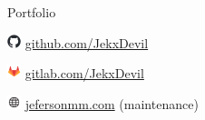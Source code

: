 \documentclass{cv} %
\def\iconsize{0.4cm}
\begin{document}
\begin{minipage}[b][0.9\paperheight][t]{0.29\linewidth}
\begin{rSection}{Portfolio}
    \item[]\includegraphics[width=\iconsize, trim={0cm 0.4cm 0cm 0cm}]{github-mark.png}
        \href{https://github.com/JekxDevil}{github.com/JekxDevil} 
    
    \item[]\includegraphics[width=\iconsize, trim={0cm 0.5cm 0cm 0cm}]{gitlab-icon.png}
        \href{https://gitlab.com/JekxDevil}{gitlab.com/JekxDevil}

    \item[]\includegraphics[width=\iconsize, trim={0cm 0.12cm 0.03cm 0cm}]{website.png}
        \href{http://jefersonmm.com}{jefersonmm.com} (maintenance)
\end{rSection}

\end{minipage}
\hspace{0.1cm}
\end{document}
